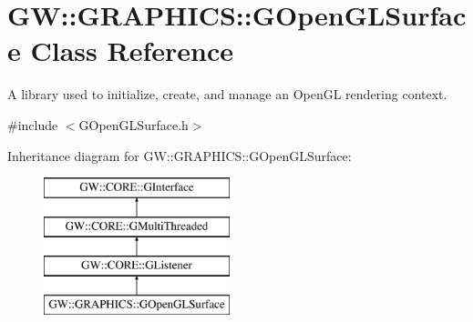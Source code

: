 \hypertarget{class_g_w_1_1_g_r_a_p_h_i_c_s_1_1_g_open_g_l_surface}{}\section{GW\+:\+:G\+R\+A\+P\+H\+I\+CS\+:\+:G\+Open\+G\+L\+Surface Class Reference}
\label{class_g_w_1_1_g_r_a_p_h_i_c_s_1_1_g_open_g_l_surface}


A library used to initialize, create, and manage an Open\+GL rendering context.  




{\ttfamily \#include $<$G\+Open\+G\+L\+Surface.\+h$>$}

Inheritance diagram for GW\+:\+:G\+R\+A\+P\+H\+I\+CS\+:\+:G\+Open\+G\+L\+Surface\+:\begin{figure}[H]
\begin{center}
\leavevmode
\includegraphics[height=4.000000cm]{class_g_w_1_1_g_r_a_p_h_i_c_s_1_1_g_open_g_l_surface}
\end{center}
\end{figure}
